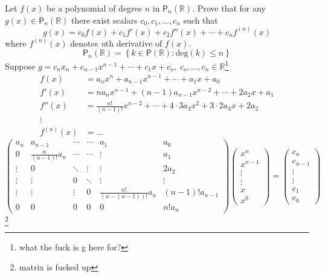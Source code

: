 Let $f(x)$ be a polynomial of degree $n$ in
$\mathsf{P}_n(\mathbb{R})$. Prove that for any $ g(x) \in
\mathsf{P}_n(\mathbb{R})$ there exist scalars $c_0,c_1,\dots,c_n$ such
that 
\[
g(x) = c_0f(x) + c_1f'(x) + c_2f''(x) + \cdots + c_nf^{(n)}(x)
\]
where $f^{(n)}(x)$ denotes {\it n}th derivative of $f(x)$.
\begin{equation}
\mathsf{P}_n\left(\mathbb{R}\right) = \left\{k \in
  \mathsf{P}\left(\mathbb{R}\right) \colon \text{deg}\left(k\right)
  \leq n\right\}
\end{equation}
Suppose $g = c_nx_n +c_{n-1}x^{n-1} + \cdots + c_1x + c_o,\;
c_o,\dots,c_n \in \mathbb{R}$\footnote{what the fuck is g here for?}
\begin{align}
f(x) &= a_nx^n + a_{n-1}x^{n-1}+\cdots+a_1x +a_0
\\
f'(x) &= na_nx^{n-1} +\left(n-1\right)a_{n-1}x^{n-2} +\cdots + 2a_2x + a_1
\\
f''(x) &= \frac{n!}{(n-1)!}x^{n-2} + \cdots + 4\cdot 3 a_3x^2 + 3\cdot
2a_3x + 2a_2
\\
\vdots
\\
f^{(n)}(x) &= \dots
\end{align}
\begin{equation}
\begin{pmatrix}
a_n & a_{n-1} & \cdots & \cdots & a_1 & a_0\\
0 & \frac{n}{(n-1)!}a_n & \cdots & \cdots  & \vdots & a_1\\
\vdots & 0 & \ddots& \vdots & \vdots & 2a_2\\
\vdots & \vdots & 0      & \ddots & \vdots & \vdots\\
\vdots & \vdots & \vdots & 0      & \frac{n!}{(n-(n-1))!}a_n & (n-1)!a_{n-1}\\
0      &0       &0       &0       &0       & n!a_n
\end{pmatrix}
\begin{pmatrix}
x^n\\
x^{n-1}\\
\vdots\\
\vdots\\
x\\
x^0
\end{pmatrix}
=
\begin{pmatrix}
c_n\\
c_{n-1}\\
\vdots\\
\vdots\\
c_1\\
c_0
\end{pmatrix}
\end{equation}
\footnote{matrix is fucked up}
